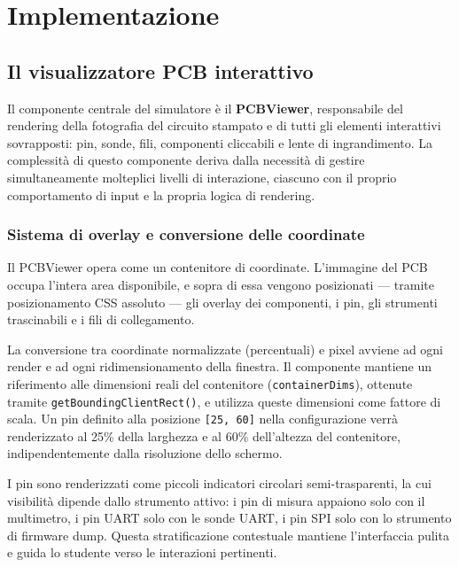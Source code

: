 \chapter{Implementazione}
\label{ch:implementazione}

\section{Il visualizzatore PCB interattivo}
\label{sec:pcb-viewer}

Il componente centrale del simulatore è il \textbf{PCBViewer}, responsabile del rendering della fotografia del circuito stampato e di tutti gli elementi interattivi sovrapposti: pin, sonde, fili, componenti cliccabili e lente di ingrandimento. La complessità di questo componente deriva dalla necessità di gestire simultaneamente molteplici livelli di interazione, ciascuno con il proprio comportamento di input e la propria logica di rendering.


\subsection{Sistema di overlay e conversione delle coordinate}

Il PCBViewer opera come un contenitore di coordinate. L'immagine del PCB occupa l'intera area disponibile, e sopra di essa vengono posizionati --- tramite posizionamento CSS assoluto --- gli overlay dei componenti, i pin, gli strumenti trascinabili e i fili di collegamento.

La conversione tra coordinate normalizzate (percentuali) e pixel avviene ad ogni render e ad ogni ridimensionamento della finestra. Il componente mantiene un riferimento alle dimensioni reali del contenitore (\texttt{containerDims}), ottenute tramite \texttt{getBoundingClientRect()}, e utilizza queste dimensioni come fattore di scala. Un pin definito alla posizione \texttt{[25, 60]} nella configurazione verrà renderizzato al 25\% della larghezza e al 60\% dell'altezza del contenitore, indipendentemente dalla risoluzione dello schermo.

I pin sono renderizzati come piccoli indicatori circolari semi-trasparenti, la cui visibilità dipende dallo strumento attivo: i pin di misura appaiono solo con il multimetro, i pin UART solo con le sonde UART, i pin SPI solo con lo strumento di firmware dump. Questa stratificazione contestuale mantiene l'interfaccia pulita e guida lo studente verso le interazioni pertinenti.

